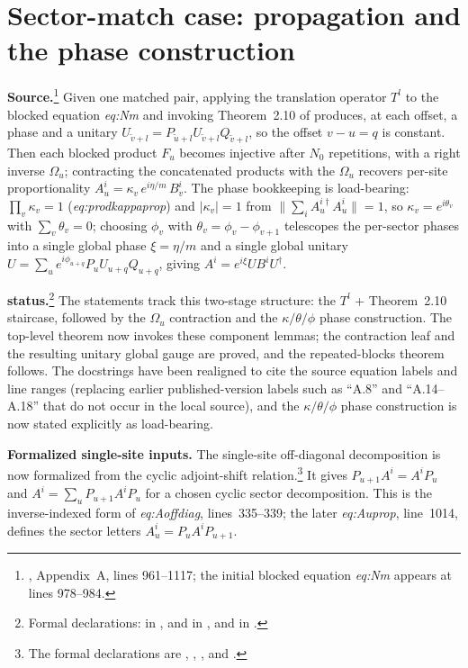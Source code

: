 \documentclass{article}
\begin{document}
\section{Sector-match case: propagation and the phase construction}

\textbf{Source.}\footnote{\cite{DeLasCuevas2017Irreducible}, Appendix~A,
lines 961--1117; the initial blocked equation \emph{eq:Nm} appears at
lines 978--984.} Given one matched pair, applying the
translation operator $T^l$ to the blocked equation \emph{eq:Nm}
and invoking Theorem~2.10 of \cite{CiracPerezGarcia2017Matrix} produces, at each
offset, a phase and a unitary $U_{\tilde v+l}=P_{\tilde u+l}U_{\tilde
v+l}Q_{\tilde v+l}$, so the offset
$v-u=q$ is constant. Then each blocked product
$F_u$ becomes injective after $N_0$ repetitions, with a right
inverse $\Omega_u$; contracting the concatenated products
with the $\Omega_u$ recovers per-site proportionality $A_u^i=\kappa_v\,
e^{i\eta/m}\,B_v^i$. The phase
bookkeeping is load-bearing: $\prod_v\kappa_v=1$ (\emph{eq:prodkappaprop}) and
$|\kappa_v|=1$ from $\|\sum_iA_u^{i\dagger}A_u^i\|=1$, so $\kappa_v=e^{i\theta_v}$
with $\sum_v\theta_v=0$; choosing $\phi_v$ with $\theta_v=\phi_v-\phi_{v+1}$
telescopes the per-sector phases into a single global phase $\xi=\eta/m$ and a
single global unitary $U=\sum_u e^{i\phi_{u+q}}P_uU_{u+q}Q_{u+q}$, giving
$A^i=e^{i\xi}UB^iU^\dagger$.

\textbf{\Lean{} status.}\footnote{Formal declarations:
 in
, and
 in
, and
 in
.}
The statements track this two-stage structure: the $T^l$ + Theorem~2.10
staircase, followed by the $\Omega_u$ contraction and the
$\kappa/\theta/\phi$ phase construction. The top-level theorem now invokes these
component lemmas; the contraction leaf
 and the resulting
unitary global gauge are proved, and the repeated-blocks theorem follows. The
docstrings have been realigned to cite the source equation labels and line
ranges (replacing earlier published-version labels such as ``A.8'' and
``A.14--A.18'' that do not occur in the local source), and the
$\kappa/\theta/\phi$ phase construction is now stated explicitly as
load-bearing.

\textbf{Formalized single-site inputs.} The single-site off-diagonal
decomposition is now formalized from the cyclic adjoint-shift
relation.\footnote{The formal declarations are
,
,
, and
.} It gives
$P_{u+1}A^i=A^iP_u$ and $A^i=\sum_u P_{u+1}A^iP_u$ for a chosen cyclic
sector decomposition. This is the inverse-indexed form of
\emph{eq:Aoffdiag}, lines~335--339; the later \emph{eq:Auprop}, line~1014,
defines the sector letters $A_u^i=P_uA^iP_{u+1}$.
\end{document}
